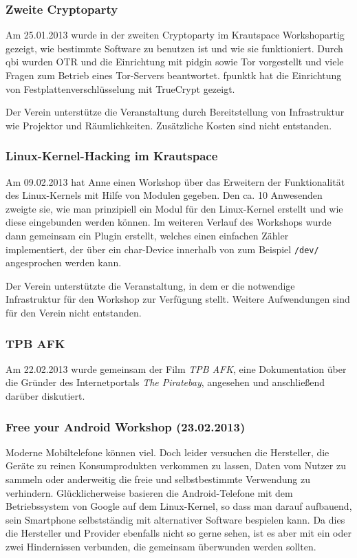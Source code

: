 \documentclass[10pt,DIV16]{scrartcl}
\begin{document}
\subsubsection{Zweite Cryptoparty}

Am 25.01.2013 wurde in der zweiten Cryptoparty im Krautspace 
Workshopartig gezeigt, wie bestimmte Software zu benutzen ist und wie 
sie funktioniert. Durch qbi wurden OTR und die Einrichtung mit pidgin 
sowie Tor vorgestellt und viele Fragen zum Betrieb eines Tor-Servers 
beantwortet. fpunktk hat die Einrichtung von Festplattenverschlüsselung 
mit TrueCrypt gezeigt. 

Der Verein unterstütze die Veranstaltung durch Bereitstellung von 
Infrastruktur wie Projektor und Räumlichkeiten. Zusätzliche Kosten sind 
nicht entstanden.

\subsubsection{Linux-Kernel-Hacking im Krautspace}

Am 09.02.2013 hat Anne einen Workshop über das Erweitern der 
Funktionalität des Linux-Kernels mit Hilfe von Modulen gegeben. Den ca. 
10 Anwesenden zweigte sie, wie man prinzipiell ein Modul für den 
Linux-Kernel erstellt und wie diese eingebunden werden können. Im 
weiteren Verlauf des Workshops wurde dann gemeinsam ein Plugin 
erstellt, welches einen einfachen Zähler implementiert, der über ein 
char-Device innerhalb von zum Beispiel \texttt{/dev/} angesprochen 
werden kann.

Der Verein unterstützte die Veranstaltung, in dem er die notwendige
Infrastruktur für den Workshop zur Verfügung stellt. Weitere
Aufwendungen sind für den Verein nicht entstanden.

\subsubsection{TPB AFK}

Am 22.02.2013 wurde gemeinsam der Film \textit{TPB AFK}, eine 
Dokumentation über die Gründer des Internetportals \textit {The 
Piratebay}, angesehen und anschließend darüber diskutiert.


\subsubsection{Free your Android Workshop (23.02.2013)}
\label{sec:free-your-android}

Moderne Mobiltelefone können viel. Doch leider versuchen die Hersteller,
die Geräte zu reinen Konsumprodukten verkommen zu lassen, Daten vom
Nutzer zu sammeln oder anderweitig die freie und selbstbestimmte
Verwendung zu verhindern. Glücklicherweise basieren die
Android-Telefone mit dem Betriebssystem von Google auf dem
Linux-Kernel, so dass man darauf aufbauend, sein Smartphone
selbstständig mit alternativer Software bespielen kann. Da dies die
Hersteller und Provider ebenfalls nicht so gerne sehen, ist es
aber mit ein oder zwei Hindernissen verbunden, die gemeinsam
überwunden werden sollten.
\end{document}

